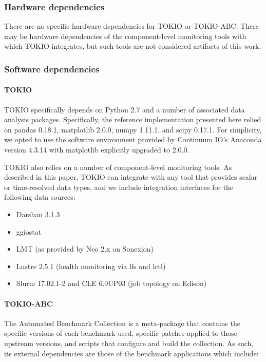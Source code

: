 \subsubsection{Hardware dependencies}

There are no specific hardware dependencies for TOKIO or TOKIO-ABC.
There may be hardware dependencies of the component-level monitoring tools with which TOKIO integrates, but such tools are not considered artifacts of this work.

\subsubsection{Software dependencies}

\paragraph{TOKIO}

TOKIO specifically depends on Python 2.7 and a number of associated data analysis packages.
Specifically, the reference implementation presented here relied on pandas 0.18.1, matplotlib 2.0.0, numpy 1.11.1, and scipy 0.17.1.
For simplicity, we opted to use the software environment provided by Continuum IO's Anaconda version 4.3.14 with matplotlib explicitly upgraded to 2.0.0.

TOKIO also relies on a number of component-level monitoring tools.
As described in this paper, TOKIO can integrate with any tool that provides scalar or time-resolved data types, and we include integration interfaces for the following data sources:

\begin{itemize}
\item Darshan 3.1.3 %
\item ggiostat
\item LMT (as provided by Neo 2.x on Sonexion) %
\item Lustre 2.5.1 (health monitoring via lfs and lctl)
\item Slurm 17.02.1-2 and CLE 6.0UP03 (job topology on Edison)
\end{itemize}

\paragraph{TOKIO-ABC} The Automated Benchmark Collection is a meta-package that contains the specific versions of each benchmark used, specific patches applied to those upstream versions, and scripts that configure and build the collection.
As such, its external dependencies are those of the benchmark applications which include:

